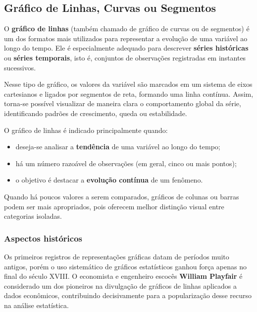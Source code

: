 \newpage
\subsection{Gráfico de Linhas, Curvas ou Segmentos}

O \textbf{gráfico de linhas} (também chamado de gráfico de curvas ou de
segmentos) é um dos formatos mais utilizados para representar a evolução de
uma variável ao longo do tempo. Ele é especialmente adequado para descrever
\textbf{séries históricas} ou \textbf{séries temporais}, isto é, conjuntos de
observações registradas em instantes sucessivos.

\vskip0.3cm

Nesse tipo de gráfico, os valores da variável são marcados em um sistema de
eixos cartesianos e ligados por segmentos de reta, formando uma linha
contínua. Assim, torna-se possível visualizar de maneira clara o comportamento
global da série, identificando padrões de crescimento, queda ou estabilidade.

\vskip0.4cm

O gráfico de linhas é indicado principalmente quando:

\begin{itemize}
    \item deseja-se analisar a \textbf{tendência} de uma variável ao longo do tempo;
    \item há um número razoável de observações (em geral, cinco ou mais pontos);
    \item o objetivo é destacar a \textbf{evolução contínua} de um fenômeno.
\end{itemize}

\vskip0.3cm

Quando há poucos valores a serem comparados, gráficos de colunas ou barras
podem ser mais apropriados, pois oferecem melhor distinção visual entre
categorias isoladas.

\vskip0.5cm

\subsubsection{Aspectos históricos}

Os primeiros registros de representações gráficas datam de períodos muito
antigos, porém o uso sistemático de gráficos estatísticos ganhou força apenas
no final do século XVIII. O economista e engenheiro escocês
\textbf{William Playfair} é considerado um dos pioneiros na divulgação de
gráficos de linhas aplicados a dados econômicos, contribuindo decisivamente
para a popularização desse recurso na análise estatística.

